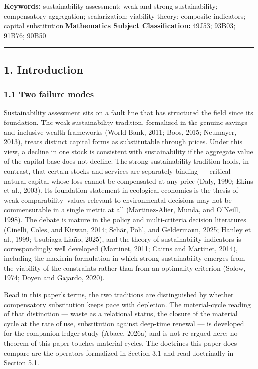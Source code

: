 \documentclass[11pt]{article}
\begin{document}
\textbf{Keywords:} sustainability assessment; weak and strong
sustainability; compensatory aggregation; scalarization; viability
theory; composite indicators; capital substitution \textbf{Mathematics
Subject Classification:} 49J53; 93B03; 91B76; 90B50

\begin{center}\rule{0.5\linewidth}{0.5pt}\end{center}

\subsection{1. Introduction}\label{introduction}

\subsubsection{1.1 Two failure modes}\label{two-failure-modes}

Sustainability assessment sits on a fault line that has structured the
field since its foundation. The weak-sustainability tradition,
formalized in the genuine-savings and inclusive-wealth frameworks (World
Bank, 2011; Boos, 2015; Neumayer, 2013), treats distinct capital forms
as substitutable through prices. Under this view, a decline in one stock
is consistent with sustainability if the aggregate value of the capital
base does not decline. The strong-sustainability tradition holds, in
contrast, that certain stocks and services are separately binding ---
critical natural capital whose loss cannot be compensated at any price
(Daly, 1990; Ekins et al., 2003). Its foundation statement in ecological
economics is the thesis of weak comparability: values relevant to
environmental decisions may not be commensurable in a single metric at
all (Martinez-Alier, Munda, and O'Neill, 1998). The debate is mature in
the policy and multi-criteria decision literatures (Cinelli, Coles, and
Kirwan, 2014; Sch\"ar, Pohl, and Geldermann, 2025; Hanley et al., 1999;
Usubiaga-Lia\~no, 2025), and the theory of sustainability indicators is
correspondingly well developed (Martinet, 2011; Cairns and Martinet,
2014), including the maximin formulation in which strong sustainability
emerges from the viability of the constraints rather than from an
optimality criterion (Solow, 1974; Doyen and Gajardo, 2020).

Read in this paper's terms, the two traditions are distinguished by
whether compensatory substitution keeps pace with depletion. The
material-cycle reading of that distinction --- waste as a relational
status, the closure of the material cycle at the rate of use,
substitution against deep-time renewal --- is developed for the
companion ledger study (Abaee, 2026a) and is not
re-argued here; no theorem of this paper touches material cycles. The
doctrines this paper does compare are the operators formalized in
Section 3.1 and read doctrinally in Section 5.1.
\end{document}
